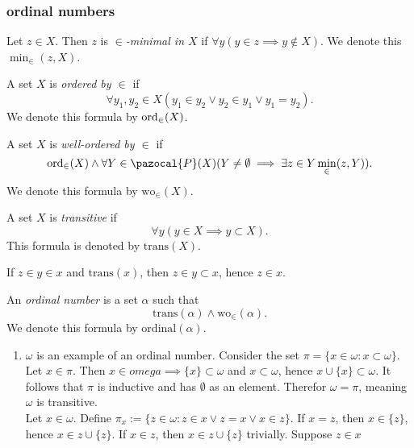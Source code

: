 \subsubsection{ordinal numbers}
\begin{definition}
    Let $z\in X$. Then $z$ is \textit{$\in$-minimal in $X$} if $\forall y(y\in z \implies y\notin X)$. We denote this $\min_\in(z,X)$.
\end{definition}
\begin{definition}
    A set $X$ is \textit{ordered by $\in$} if 
    $$\forall y_1,y_2\in X(y_1\in y_2\vee y_2\in y_1 \vee y_1=y_2).$$
    We denote this formula by $\mathrm{ord}_\in(X)$.
\end{definition}
\begin{definition}
    A set $X$ is \textit{well-ordered by $\in$} if 
    $$ \ord_\in(X) \wedge \forall Y \in \pazocal{P}(X)(Y\neq \emptyset \implies \exists z \in Y \min_\in(z,Y)).$$
    We denote this formula by $\mathrm{wo}_\in(X)$.
\end{definition}
\begin{definition}
    A set $X$ is \textit{transitive} if 
    $$\forall y(y\in X \implies y\subset X).$$
    This formula is denoted by $\mathrm{trans}(X)$. 
\end{definition}
\begin{remark}
    If $z\in y\in x$ and $\mathrm{trans}(x)$, then $z\in y\subset x$, hence $z\in x$. 
\end{remark}
\begin{definition}
    An \textit{ordinal number} is a set $\alpha$ such that 
    $$\mathrm{trans}(\alpha)\wedge \mathrm{wo}_\in(\alpha).$$
    We denote this formula by $\mathrm{ordinal}(\alpha)$.
\end{definition}
\begin{example}
    \begin{enumerate}
        \item $\omega$ is an example of an ordinal number. Consider the set $\pi = \{x\in \omega :x\subset \omega\}$. Let $x\in \pi$. Then $x\in omega \implies \{x\}\subset \omega$ and $x\subset \omega$, hence $x\cup\{x\}\subset \omega$. It follows that $\pi$ is inductive and has $\emptyset$ as an element. Therefor $\omega = \pi$, meaning $\omega$ is transitive.\\
        Let $x\in \omega$. Define $\pi_x:=\{z\in \omega : z\in x\vee z= x \vee x\in z\}$. If $x=z$, then $x\in \{z\}$, hence $x\in z\cup \{z\}$. If $x\in z$, then $x\in z\cup\{z\}$ trivially. Suppose $z\in x$
    \end{enumerate}
\end{example}
